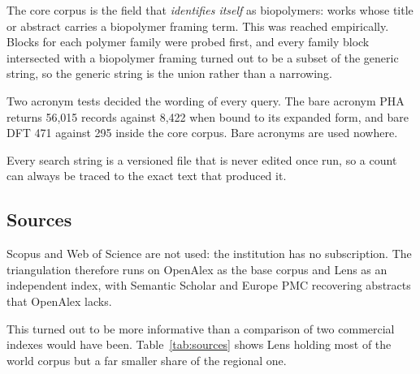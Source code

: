 \documentclass[11pt,a4paper]{article}
\begin{document}
The core corpus is the field that \emph{identifies itself} as biopolymers: works whose
title or abstract carries a biopolymer framing term. This was reached empirically. Blocks
for each polymer family were probed first, and every family block intersected with a
biopolymer framing turned out to be a subset of the generic string, so the generic string is
the union rather than a narrowing.

Two acronym tests decided the wording of every query. The bare acronym PHA returns 56{,}015
records against 8{,}422 when bound to its expanded form, and bare DFT 471 against 295 inside
the core corpus. Bare acronyms are used nowhere.

Every search string is a versioned file that is never edited once run, so a count can always
be traced to the exact text that produced it.

\subsection{Sources}

Scopus and Web of Science are not used: the institution has no subscription. The
triangulation therefore runs on OpenAlex as the base corpus and Lens as an independent
index, with Semantic Scholar and Europe PMC recovering abstracts that OpenAlex lacks.

This turned out to be more informative than a comparison of two commercial indexes would
have been. Table~\ref{tab:sources} shows Lens holding most of the world corpus but a far
smaller share of the regional one.
\end{document}
